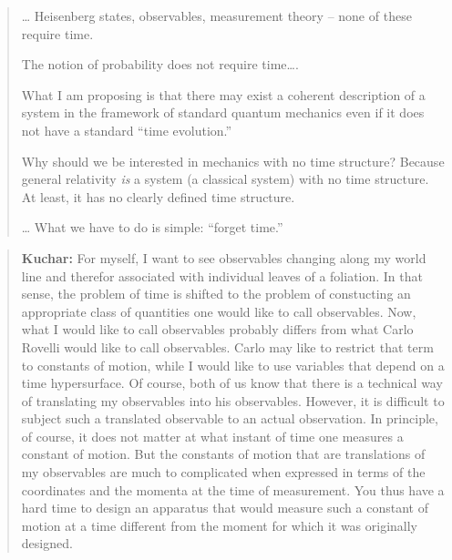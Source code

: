 \documentclass{article}
\begin{document}
\begin{quote}
\ldots{} Heisenberg states, observables, measurement theory -- none of
these require time.

The notion of probability does not require time\ldots.

What I am proposing is that there may exist a coherent description of a
system in the framework of standard quantum mechanics even if it does
not have a standard ``time evolution.''

Why should we be interested in mechanics with no time structure? Because
general relativity \emph{is} a system (a classical system) with no time
structure. At least, it has no clearly defined time structure.

\ldots{} What we have to do is simple: ``forget time.''
\end{quote}

\begin{quote}
\textbf{Kuchar:} For myself, I want to see observables changing along my
world line and therefor associated with individual leaves of a
foliation. In that sense, the problem of time is shifted to the problem
of constucting an appropriate class of quantities one would like to call
observables. Now, what I would like to call observables probably differs
from what Carlo Rovelli would like to call observables. Carlo may like
to restrict that term to constants of motion, while I would like to use
variables that depend on a time hypersurface. Of course, both of us know
that there is a technical way of translating my observables into his
observables. However, it is difficult to subject such a translated
observable to an actual observation. In principle, of course, it does
not matter at what instant of time one measures a constant of motion.
But the constants of motion that are translations of my observables are
much to complicated when expressed in terms of the coordinates and the
momenta at the time of measurement. You thus have a hard time to design
an apparatus that would measure such a constant of motion at a time
different from the moment for which it was originally designed.
\end{quote}
\end{document}
